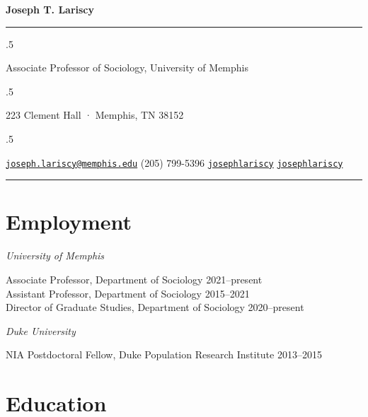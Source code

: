 \documentclass[11pt,]{article}
\begin{document}
\centerline{\huge \bf Joseph T. Lariscy}

\vspace{2 mm}

\hrule

\vspace{2 mm}

\moveleft.5\hoffset\centerline{Associate Professor of Sociology,
University of Memphis}
\moveleft.5\hoffset\centerline{223 Clement Hall · Memphis, TN 38152}
\moveleft.5\hoffset\centerline{ \faEnvelopeO \hspace{1 mm} \href{mailto:}{\tt \href{mailto:joseph.lariscy@memphis.edu}{\nolinkurl{joseph.lariscy@memphis.edu}}} \hspace{1 mm}  \faPhone \hspace{1 mm}  (205)
799-5396  \hspace{1 mm}  \faGithub \hspace{1 mm} \href{http://github.com/josephlariscy}{\tt josephlariscy} \hspace{1 mm}   \faTwitter \hspace{1 mm} \href{https:/twitter.com/josephlariscy}{\tt josephlariscy} \hspace{1 mm}    } 

\vspace{2 mm}

\hrule


\hypertarget{employment}{%
\section{Employment}\label{employment}}

\emph{University of Memphis}

\setlength{\leftskip}{1cm}

Associate Professor, Department of Sociology \hfill 2021--present\\
Assistant Professor, Department of Sociology \hfill 2015--2021\\
Director of Graduate Studies, Department of Sociology
\hfill 2020--present

\setlength{\leftskip}{0pt}

\emph{Duke University}

\setlength{\leftskip}{1cm}

NIA Postdoctoral Fellow, Duke Population Research Institute
\hfill 2013--2015

\setlength{\leftskip}{0pt}

\hypertarget{education}{%
\section{Education}\label{education}}
\end{document}
